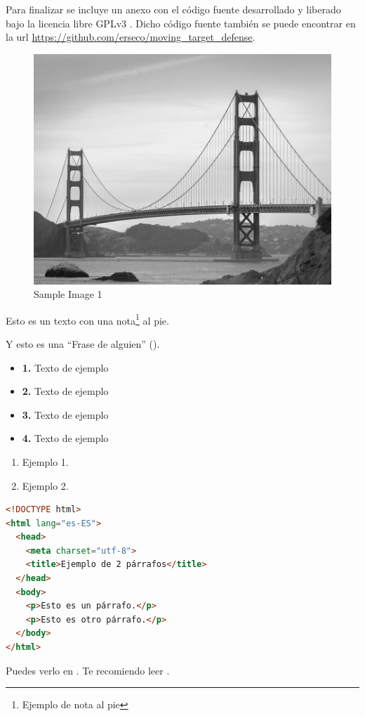 \bigskip
Para finalizar se incluye un anexo con el código fuente desarrollado y liberado bajo la licencia libre GPLv3 \cite{free_software_foundation_gnu_2007}. Dicho código fuente también se puede encontrar en la url \url{https://github.com/erseco/moving_target_defense}.



%
%

\begin{figure}[h!]
\centering
\includegraphics[width=1.0\textwidth]{../images/sample1}
\caption{Sample Image 1}
\label{fig:sample1}
\end{figure}

Esto es un texto con una nota\footnote{Ejemplo de nota al pie} al pie.

Y esto es una ``Frase de alguien'' (\cite{john_evolutionary_2014}).

\begin{itemize}
  \item \textbf{1.} Texto de ejemplo
  \item \textbf{2.} Texto de ejemplo
  \item \textbf{3.} Texto de ejemplo
  \item \textbf{4.} Texto de ejemplo

\end{itemize}

\begin{enumerate}
	\item Ejemplo 1.
	\item Ejemplo 2.
\end{enumerate}

\begin{lstlisting}[language=html]
<!DOCTYPE html>
<html lang="es-ES">
  <head>
    <meta charset="utf-8">
    <title>Ejemplo de 2 párrafos</title>
  </head>
  <body>
    <p>Esto es un párrafo.</p>
    <p>Esto es otro párrafo.</p>
  </body>
</html>
\end{lstlisting}

Puedes verlo en \cite{merelo-guervos_comparison_2016}. Te recomiendo leer \cite{clark_is_2009, zhang_genetic_2009, schlenker_deceiving_2018, gensch_evolving_2016}.
